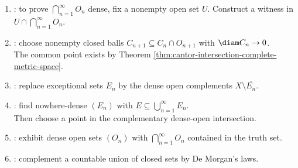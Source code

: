 \begin{proofmethod} \label{meth:baire-category-proof-patterns} 
\begin{enumerate}[label=(\roman*)]
\setlength{\itemsep}{0pt}
\item {}: to prove $\bigcap\limits_{n=1}^{\infty}O_n$ dense, fix a nonempty open set $U$. Construct a witness in $U\cap\bigcap\limits_{n=1}^{\infty}O_n$.
\item {}: choose nonempty closed balls $C_{n+1}\subseteq C_n\cap O_{n+1}$ with $\diam C_n\to0$.\\
The common point exists by Theorem \ref{thm:cantor-intersection-complete-metric-space}.
\item {}: replace exceptional sets $E_n$ by the dense open complements $X\setminus\overline{E_n}$.
\item {}: find nowhere-dense $(E_n)$ with $E\subseteq\bigcup\limits_{n=1}^{\infty}E_n$.\\
Then choose a point in the complementary dense-open intersection.
\item {}: exhibit dense open sets $(O_n)$ with $\bigcap\limits_{n=1}^{\infty}O_n$ contained in the truth set.
\item {}: complement a countable union of closed sets by De Morgan's laws.
\end{enumerate}
\end{proofmethod}
